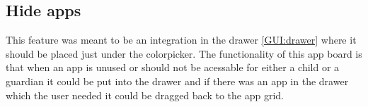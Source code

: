 \subsection{Hide apps}
\label{backlog:hide_apps}

This feature was meant to be an integration in the drawer \autoref{GUI:drawer} where it should be placed just under the colorpicker. The functionality of this app board is that when an app is unused or should not be acessable for either a child or a guardian it could be put into the drawer and if there was an app in the drawer which the user needed it could be dragged back to the app grid.